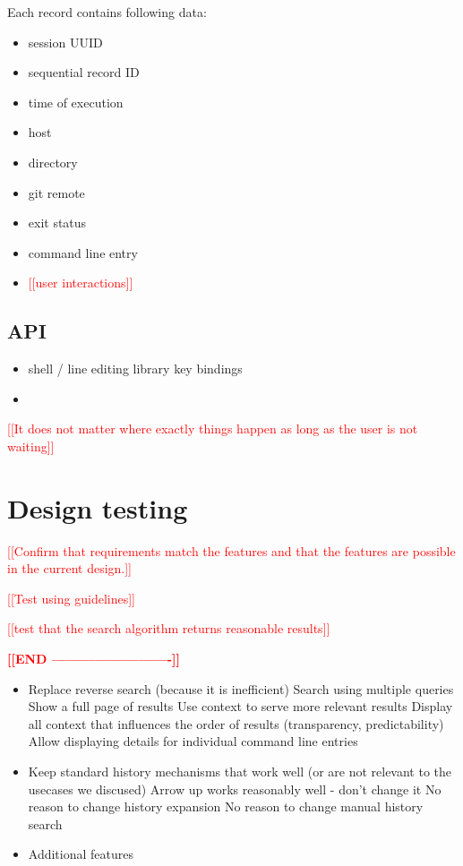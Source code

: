 \documentclass[thesis=M,english]{FITthesis}[2012/10/20]
\newcommand{\todotext}[1]{\textcolor{red}{\textbf{[[#1]]}}}
\newcommand{\redtext}[1]{\textcolor{red}{[[#1]]}}
\begin{document}
Each record contains following data:
\begin{itemize}
    \item session UUID
    \item sequential record ID
    \item time of execution
    \item host
    \item directory
    \item git remote
    \item exit status
    \item command line entry
    \item \redtext{user interactions}
\end{itemize}

\subsection{API}

\begin{itemize}
    \item shell / line editing library
    \subitem key bindings
    \item 
\end{itemize}

\redtext{It does not matter where exactly things happen as long as the user is not waiting}

\section{Design testing}

\redtext{Confirm that requirements match the features and that the features are possible in the current design.}

\redtext{Test using guidelines}

\redtext{test that the search algorithm returns reasonable results}


\todotext{END -------------------------}

\begin{itemize}

    \item Replace reverse search (because it is inefficient)
    \subitem Search using multiple queries
    \subitem Show a full page of results
    \subitem Use context to serve more relevant results
    \subitem Display all context that influences the order of results (transparency, predictability)
    \subitem Allow displaying details for individual command line entries
    \item Keep standard history mechanisms that work well (or are not relevant to the usecases we discused)
    \subitem Arrow up works reasonably well - don't change it
    \subitem No reason to change history expansion
    \subitem No reason to change manual history search
    \item Additional features
    \subitem 
    \subitem 
    
\end{itemize}
\end{document}

